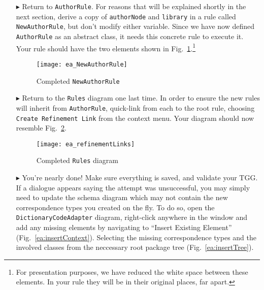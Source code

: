 \begin{itemize}
\item[$\blacktriangleright$] Return to \texttt{AuthorRule}. For reasons that will be explained shortly in the next section, derive a copy of \texttt{authorNode}
and \texttt{library} in a rule called \texttt{NewAuthorRule}, but don't modify either variable. Since we have now defined \texttt{AuthorRule} as an abstract
class, it needs this concrete rule to execute it. Your rule should have the two elements shown in Fig.~\ref{ea:NewAuthorRule}.\footnote{For presentation
purposes, we have reduced the white space between these elements. In your rule they will be in their original places, far apart.}

\vspace{0.5cm}

\begin{figure}[htbp]
\begin{center}
  \texttt{[image: ea\_NewAuthorRule]}
  \caption{Completed \texttt{NewAuthorRule}}
  \label{ea:NewAuthorRule}
\end{center}
\end{figure}

\item[$\blacktriangleright$] Return to the \texttt{Rules} diagram one last time. In order to ensure the new rules will inherit from \texttt{AuthorRule},
quick-link from each to the root rule, choosing \texttt{Create Refinement Link} from the context menu. Your diagram should now resemble
Fig.~\ref{ea:refinementClasses}.

\vspace{0.5cm}

\begin{figure}[htbp]
\begin{center}
  \texttt{[image: ea\_refinementLinks]}
  \caption{Completed \texttt{Rules} diagram}
  \label{ea:refinementClasses}
\end{center}
\end{figure}


\item[$\blacktriangleright$] You're nearly done! Make sure everything is saved, and validate your TGG. If a dialogue appears saying the attempt was
unsuccessful, you may simply need to update the schema diagram which may not contain the new correspondence types you created on the fly. To do so, open the
\texttt{DictionaryCodeAdapter} diagram, right-click anywhere in the window and add any missing elements by navigating to ``Insert Existing Element''
(Fig.~\ref{ea:insertContext}). Selecting the missing correspondence types and the involved classes from the neccessary root package tree
(Fig.~\ref{ea:insertTree}).


\end{itemize}
